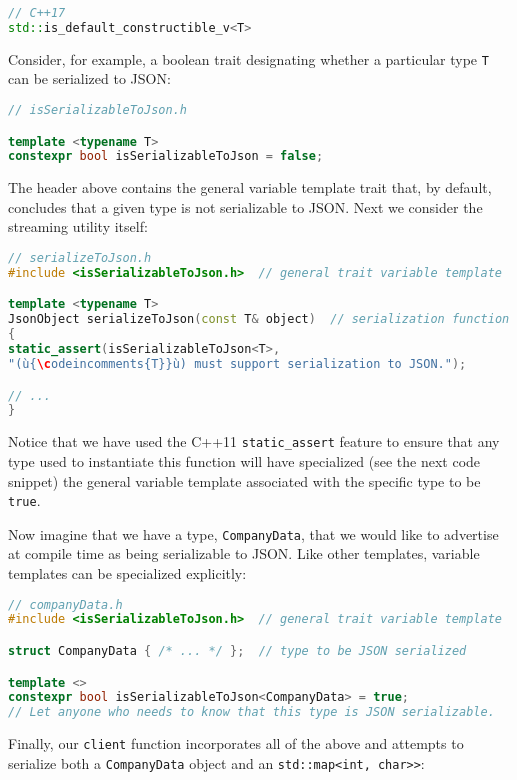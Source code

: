 {{{\begin{lstlisting}[language=C++, basicstyle={\ttfamily\footnotesize}]
// C++17
std::is_default_constructible_v<T>
\end{lstlisting}
}}

Consider, for example, a boolean trait designating whether a particular
type \texttt{T} can be serialized to JSON:

\begin{lstlisting}[language=C++]
// isSerializableToJson.h

template <typename T>
constexpr bool isSerializableToJson = false;
\end{lstlisting}

\noindent The header above contains the general variable template trait that, by
default, concludes that a given type is not serializable to JSON. Next
we consider the streaming utility itself:

\begin{lstlisting}[language=C++]
// serializeToJson.h
#include <isSerializableToJson.h>  // general trait variable template

template <typename T>
JsonObject serializeToJson(const T& object)  // serialization function template
{
static_assert(isSerializableToJson<T>,
"(ù{\codeincomments{T}}ù) must support serialization to JSON.");

// ...
}
\end{lstlisting}

\noindent Notice that we have used the C++11
\texttt{static\_assert} feature to ensure that any type
used to instantiate this function will have specialized (see the next code snippet) the
general variable template associated with the specific type to be
\texttt{true}.

Now imagine that we have a type, \texttt{CompanyData}, that we would
like to advertise at compile time as being serializable to JSON. Like
other templates, variable templates can be specialized explicitly:

\begin{lstlisting}[language=C++]
// companyData.h
#include <isSerializableToJson.h>  // general trait variable template

struct CompanyData { /* ... */ };  // type to be JSON serialized

template <>
constexpr bool isSerializableToJson<CompanyData> = true;
// Let anyone who needs to know that this type is JSON serializable.
\end{lstlisting}

\noindent Finally, our \texttt{client} function incorporates all of the above and
attempts to serialize both a \texttt{CompanyData} object and an
\texttt{std::map<int,}~\texttt{char>>}:

}

